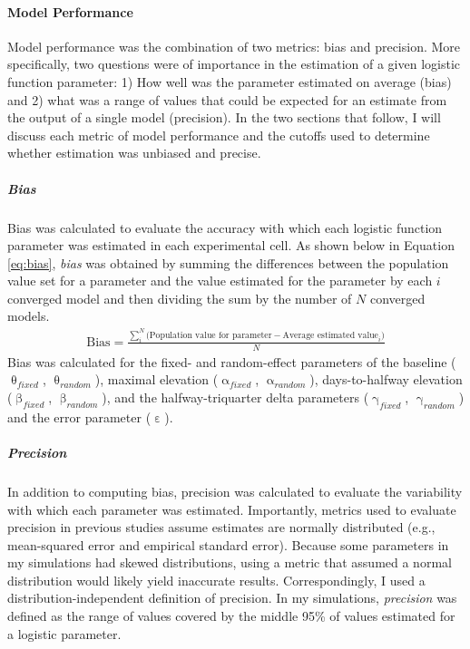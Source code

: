 \documentclass[
12pt, %
twoside,
english]{guelphthesis}
\begin{document}
\hypertarget{model-performance-2}{%
\paragraph{Model Performance}\label{model-performance-2}}

Model performance was the combination of two metrics: bias and precision. More specifically, two questions were of importance in the estimation of a given logistic function parameter: 1) How well was the parameter estimated on average (bias) and 2) what was a range of values that could be expected for an estimate from the output of a single model (precision). In the two sections that follow, I will discuss each metric of model performance and the cutoffs used to determine whether estimation was unbiased and precise.

\hypertarget{bias-comp}{%
\subparagraph{Bias}\label{bias-comp}}

Bias was calculated to evaluate the accuracy with which each logistic
function parameter was estimated in each experimental cell. As shown below in Equation
\eqref{eq:bias}, \emph{bias} was obtained by summing the differences
between the population value set for a parameter and the value estimated for the parameter by each \(i\) converged model and then dividing the sum by the number of \(N\) converged models.
\begin{align}
  \text{Bias} = \frac{\sum_i^N\text{(Population value for parameter} - \text{Average estimated value}_i)}{N}
  \label{eq:bias} 
\end{align}
\noindent Bias was calculated for the fixed- and random-effect parameters of the baseline (\(\uptheta_{fixed}\), \(\uptheta_{random}\)), maximal elevation (\(\upalpha_{fixed}\), \(\upalpha_{random}\)), days-to-halfway elevation (\(\upbeta_{fixed}\), \(\upbeta_{random}\)), and the halfway-triquarter delta parameters (\(\upgamma_{fixed}\), \(\upgamma_{random}\)) and the error parameter (\(\upepsilon\)).

\hypertarget{pres-precision}{%
\subparagraph{Precision}\label{pres-precision}}

In addition to computing bias, precision was calculated to evaluate the variability with which each parameter was estimated. Importantly, metrics used to evaluate precision in previous studies assume estimates are normally distributed (e.g., mean-squared error and empirical standard error). Because some parameters in my simulations had skewed distributions, using a metric that assumed a normal distribution would likely yield inaccurate results. Correspondingly, I used a distribution-independent definition of precision. In my simulations, \emph{precision} was defined as the range of values covered by the middle 95\% of values estimated for a logistic parameter.
\end{document}
